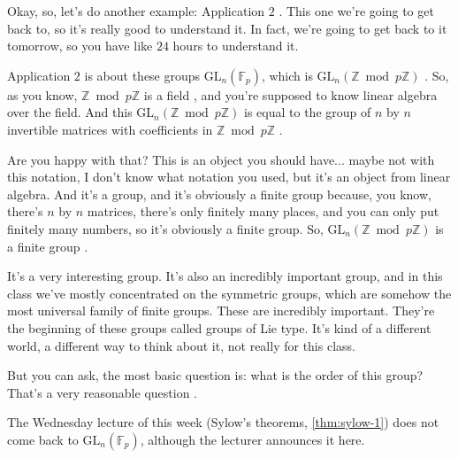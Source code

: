 \begin{speech}[01:08:04 - 01:10:05]
Okay, so, let's do another example: Application $2$ . This one we're going to get back to, so it's really good to understand it. In fact, we're going to get back to it tomorrow, so you have like $24$ hours to understand it.

Application $2$ is about these groups $\mathrm{GL}_n(\mathbb{F}_p)$, which is $\mathrm{GL}_n(\mathbb{Z} \bmod p \mathbb{Z})$ . So, as you know, $\mathbb{Z} \bmod p \mathbb{Z}$ is a field , and you're supposed to know linear algebra over the field. And this $\mathrm{GL}_n(\mathbb{Z} \bmod p \mathbb{Z})$ is equal to the group of $n$ by $n$ invertible matrices with coefficients in $\mathbb{Z} \bmod p \mathbb{Z}$ .

Are you happy with that? This is an object you should have... maybe not with this notation, I don't know what notation you used, but it's an object from linear algebra. And it's a group, and it's obviously a finite group because, you know, there's $n$ by $n$ matrices, there's only finitely many places, and you can only put finitely many numbers, so it's obviously a finite group. So, $\mathrm{GL}_n(\mathbb{Z} \bmod p \mathbb{Z})$ is a finite group .

It's a very interesting group. It's also an incredibly important group, and in this class we've mostly concentrated on the symmetric groups, which are somehow the most universal family of finite groups. These are incredibly important. They're the beginning of these groups called groups of Lie type. It's kind of a different world, a different way to think about it, not really for this class.

But you can ask, the most basic question is: what is the order of this group? That's a very reasonable question .
\end{speech}

\begin{aiNote}
The Wednesday lecture of this week (Sylow's theorems, \cref{thm:sylow-1}) does not come back to $\mathrm{GL}_n(\mathbb{F}_p)$, although the lecturer announces it here.
\end{aiNote}

